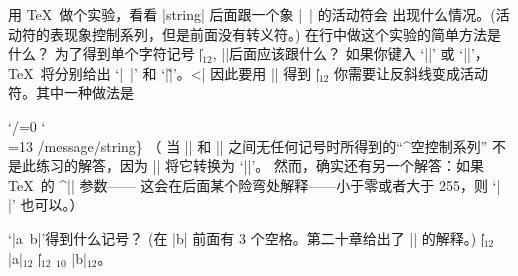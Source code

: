 {{{{%
\ddangerexercise 用 \TeX\ 做个实验，看看 |string| 后面跟一个象 |~| 的活动符会%
出现什么情况。(活动符的表现象控制系列，但是前面没有转义符。)
在行中做这个实验的简单方法是什么？
为了得到单个字符记号 |\|$_{12}$, |\string|后面应该跟什么？
\answer 如果你键入 `|\message{\string~}|' 或 `|\message{\string\~}|'，
\TeX\ 将分别给出 `|~|' 和 `|\~|'。^^|\message|%
因此要用 |\string| 得到 |\|$_{12}$ 你需要让反斜线变成活动符。其中一种做法是
\begintt
{\catcode`/=0 \catcode`\\=13 /message{/string\}}
\endtt
（ 当 |\csname| 和 |\endcsname| 之间无任何记号时所得到的``^{空控制系列}''%
不是此练习的解答，因为 |\string| 将它转换为 `|\csname\endcsname|'。
然而，确实还有另一个解答：如果 \TeX\ 的 ^|\escapechar| 参数——%
这会在后面某个险弯处解释——小于零或者大于 255，则 `|\string\\|' 也可以。）

\ddangerexercise `|\expandafter\string\csname a\string\   b\endcsname|'得到什么记号？
(在 |b| 前面有 3 个空格。第二十章给出了 |\expandafter| 的解释。)
\answer |\|$_{12}$ |a|$_{12}$ |\|$_{12}$ \]$_{10}$ |b|$_{12}$。

}}}}}
